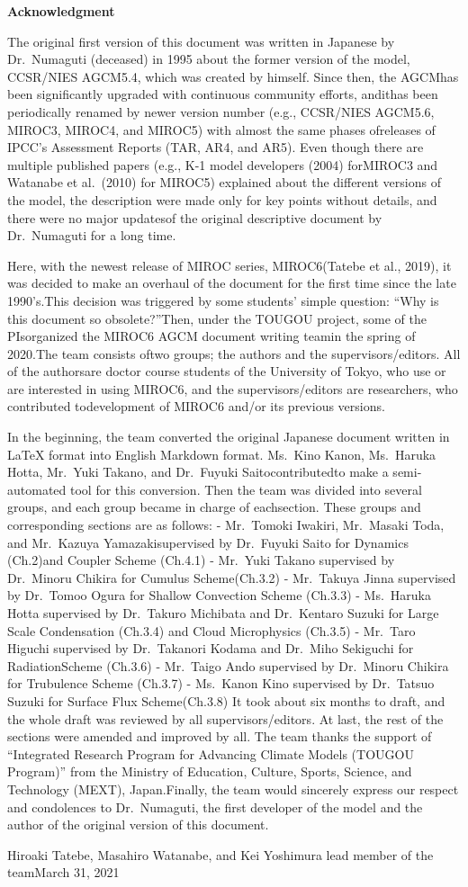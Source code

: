 \textbf{Acknowledgment}

The original first version of this document was written in Japanese by
Dr.~Numaguti (deceased) in 1995 about the former version of the model,
CCSR/NIES AGCM5.4, which was created by himself. Since then, the AGCMhas
been significantly upgraded with continuous community efforts, andithas
been periodically renamed by newer version number (e.g., CCSR/NIES
AGCM5.6, MIROC3, MIROC4, and MIROC5) with almost the same phases
ofreleases of IPCC's Assessment Reports (TAR, AR4, and AR5). Even though
there are multiple published papers (e.g., K-1 model developers (2004)
forMIROC3 and Watanabe et al.~(2010) for MIROC5) explained about the
different versions of the model, the description were made only for key
points without details, and there were no major updatesof the original
descriptive document by Dr.~Numaguti for a long time.

Here, with the newest release of MIROC series, MIROC6(Tatebe et al.,
2019), it was decided to make an overhaul of the document for the first
time since the late 1990's.This decision was triggered by some students'
simple question: ``Why is this document so obsolete?''Then, under the
TOUGOU project, some of the PIsorganized the MIROC6 AGCM document
writing teamin the spring of 2020.The team consists oftwo groups; the
authors and the supervisors/editors. All of the authorsare doctor course
students of the University of Tokyo, who use or are interested in using
MIROC6, and the supervisors/editors are researchers, who contributed
todevelopment of MIROC6 and/or its previous versions.

In the beginning, the team converted the original Japanese document
written in LaTeX format into English Markdown format. Ms.~Kino Kanon,
Ms.~Haruka Hotta, Mr.~Yuki Takano, and Dr.~Fuyuki Saitocontributedto
make a semi-automated tool for this conversion. Then the team was
divided into several groups, and each group became in charge of
eachsection. These groups and corresponding sections are as follows: -
Mr.~Tomoki Iwakiri, Mr.~Masaki Toda, and Mr.~Kazuya Yamazakisupervised
by Dr.~Fuyuki Saito for Dynamics (Ch.2)and Coupler Scheme (Ch.4.1) -
Mr.~Yuki Takano supervised by Dr.~Minoru Chikira for Cumulus
Scheme(Ch.3.2) - Mr.~Takuya Jinna supervised by Dr.~Tomoo Ogura for
Shallow Convection Scheme (Ch.3.3) - Ms.~Haruka Hotta supervised by
Dr.~Takuro Michibata and Dr.~Kentaro Suzuki for Large Scale Condensation
(Ch.3.4) and Cloud Microphysics (Ch.3.5) - Mr.~Taro Higuchi supervised
by Dr.~Takanori Kodama and Dr.~Miho Sekiguchi for RadiationScheme
(Ch.3.6) - Mr.~Taigo Ando supervised by Dr.~Minoru Chikira for
Trubulence Scheme (Ch.3.7) - Ms.~Kanon Kino supervised by Dr.~Tatsuo
Suzuki for Surface Flux Scheme(Ch.3.8) It took about six months to
draft, and the whole draft was reviewed by all supervisors/editors. At
last, the rest of the sections were amended and improved by all. The
team thanks the support of ``Integrated Research Program for Advancing
Climate Models (TOUGOU Program)'' from the Ministry of Education,
Culture, Sports, Science, and Technology (MEXT), Japan.Finally, the team
would sincerely express our respect and condolences to Dr.~Numaguti, the
first developer of the model and the author of the original version of
this document.

Hiroaki Tatebe, Masahiro Watanabe, and Kei Yoshimura lead member of the
teamMarch 31, 2021
